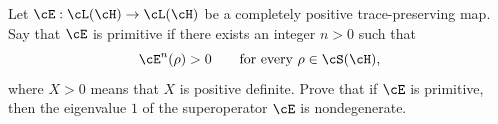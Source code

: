 Let $\cE:\cL(\cH)\to\cL(\cH)$ be a completely positive trace-preserving map. Say that $\cE$ is primitive if there exists an integer $n>0$ such that
$$
\cE^n(\rho)>0
\qquad
\text{for every }\rho\in\cS(\cH),
$$
where $X>0$ means that $X$ is positive definite. Prove that if $\cE$ is primitive, then the eigenvalue $1$ of the superoperator $\cE$ is nondegenerate.
